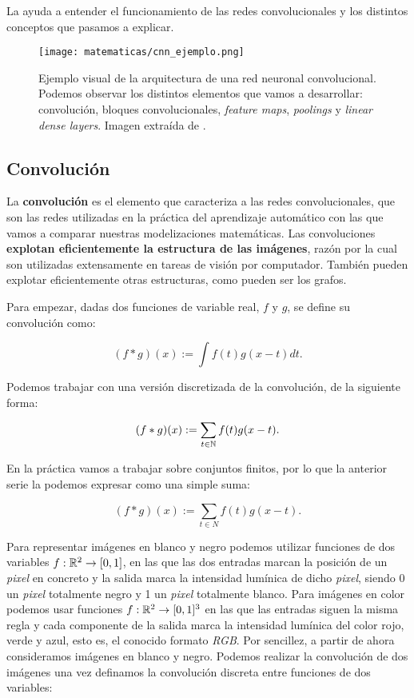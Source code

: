 La  ayuda a entender el funcionamiento de las redes convolucionales y los distintos conceptos que pasamos a explicar.

\begin{figure}[!hbtp]
    \centering
    \texttt{[image: matematicas/cnn\_ejemplo.png]}
    \caption{Ejemplo visual de la arquitectura de una red neuronal convolucional. Podemos observar los distintos elementos que vamos a desarrollar: convolución, bloques convolucionales, \textit{feature maps}, \textit{poolings} y \textit{linear dense layers}. Imagen extraída de \cite{matematicas:ejemplo_cnn}.}
    \label{img:ejemplo_cnn}
\end{figure}

\subsection{Convolución}

La \textbf{convolución} es el elemento que caracteriza a las redes convolucionales, que son las redes utilizadas en la práctica del aprendizaje automático con las que vamos a comparar nuestras modelizaciones matemáticas. Las convoluciones \textbf{explotan eficientemente la estructura de las imágenes}, razón por la cual son utilizadas extensamente en tareas de visión por computador. También pueden explotar eficientemente otras estructuras, como pueden ser los grafos.

Para empezar, dadas dos funciones de variable real, $f$ y $g$, se define su convolución como:

\begin{equation}
    (f * g)(x) := \int f(t) g(x - t) dt.
\end{equation}

Podemos trabajar con una versión discretizada de la convolución, de la siguiente forma:

\begin{equation}
    (f * g)(x) := \sum_{t \in \mathbb{N}} f(t) g(x - t).
\end{equation}

En la práctica vamos a trabajar sobre conjuntos finitos, por lo que la anterior serie la podemos expresar como una simple suma:

\begin{equation}
    (f * g)(x) := \sum_{t \in N} f(t) g(x - t).
\end{equation}

Para representar imágenes en blanco y negro podemos utilizar funciones de dos variables $f: \mathbb{R}^2 \to [0, 1]$, en las que las dos entradas marcan la posición de un \textit{pixel} en concreto y la salida marca la intensidad lumínica de dicho \textit{pixel}, siendo 0 un \textit{pixel} totalmente negro y 1 un \textit{pixel} totalmente blanco. Para imágenes en color podemos usar funciones $f: \mathbb{R}^2 \to [0,1]^3$ en las que las entradas siguen la misma regla y cada componente de la salida marca la intensidad lumínica del color rojo, verde y azul, esto es, el conocido formato \textit{RGB}. Por sencillez, a partir de ahora consideramos imágenes en blanco y negro. Podemos realizar la convolución de dos imágenes una vez definamos la convolución discreta entre funciones de dos variables:

